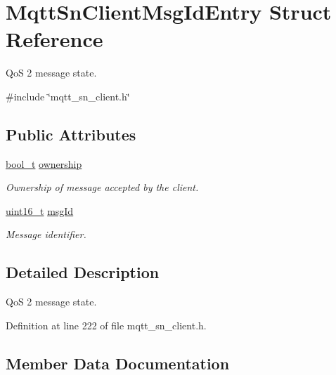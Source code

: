 \hypertarget{structMqttSnClientMsgIdEntry}{}\section{Mqtt\+Sn\+Client\+Msg\+Id\+Entry Struct Reference}
\label{structMqttSnClientMsgIdEntry}


QoS 2 message state.  




{\ttfamily \#include \char`\"{}mqtt\+\_\+sn\+\_\+client.\+h\char`\"{}}

\subsection*{Public Attributes}
\begin{DoxyCompactItemize}
\item 
\hyperlink{compiler__port_8h_a812d16e5494522586b3784e55d479912}{bool\+\_\+t} \hyperlink{structMqttSnClientMsgIdEntry_ab580cf58e322c49df34e13e7ef5e9836}{ownership}
\begin{DoxyCompactList}\small\item\em Ownership of message accepted by the client. \end{DoxyCompactList}\item 
\hyperlink{stdint_8h_a273cf69d639a59973b6019625df33e30}{uint16\+\_\+t} \hyperlink{structMqttSnClientMsgIdEntry_a32c9fd5bd1f80267c00549ddfa319c46}{msg\+Id}
\begin{DoxyCompactList}\small\item\em Message identifier. \end{DoxyCompactList}\end{DoxyCompactItemize}


\subsection{Detailed Description}
QoS 2 message state. 

Definition at line 222 of file mqtt\+\_\+sn\+\_\+client.\+h.



\subsection{Member Data Documentation}
\mbox{\label{structMqttSnClientMsgIdEntry_a32c9fd5bd1f80267c00549ddfa319c46}} 
